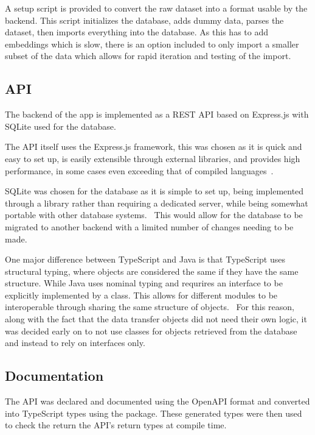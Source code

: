 A setup script is provided to convert the raw dataset into a format usable by the backend.
This script initializes the database, adds dummy data, parses the dataset, then imports everything
into the database. As this has to add embeddings which is slow, there is an option included
to only import a smaller subset of the data which allows for rapid iteration and testing of the import.

\subsection{API}

The backend of the app is implemented as a REST API based on Express.js with SQLite
used for the database.


The API itself uses the Express.js framework, this was chosen as it is quick and easy to set up, is easily extensible
through external libraries, and provides high performance, in some cases even exceeding that of
compiled languages~\cite{karlsson_performance_2021}.

SQLite was chosen for the database as it is simple to set up, being implemented through
a library rather than requiring a dedicated server, while being somewhat portable with other
database systems.~\cite{kreibich_using_2010} This would allow for the database to be migrated to
another backend with a limited number of changes needing to be made.

One major difference between TypeScript and Java is that TypeScript uses structural typing, where objects are considered
the same if they have the same structure. While Java uses nominal typing and requrires an interface to be explicitly
implemented by a class. This allows for different modules to be interoperable through sharing the same structure of objects.~\cite{gil_whiteoak_2008}
For this reason, along with the fact that the data transfer objects did not need their own logic, it was decided early on
to not use classes for objects retrieved from the database and instead to rely on interfaces only.


\subsection{Documentation}
The API was declared and documented using the OpenAPI format and converted
into TypeScript types using the  package. These
generated types were then used to check the return the API's return types at compile time.

